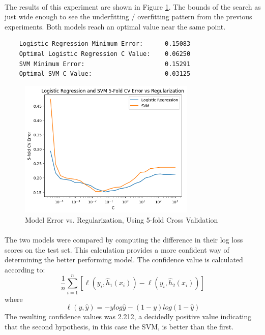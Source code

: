 \documentclass[12pt, letterpaper]{article}
\begin{document}
\paragraph*{}The results of this experiment are shown in Figure \ref{fig:6}. The
bounds of the search as just wide enough to see the underfitting / overfitting
pattern from the previous experiments. Both models reach an optimal value near
the same point.

\begin{verbatim}
    Logistic Regression Minimum Error:      0.15083
    Optimal Logistic Regression C Value:    0.06250
    SVM Minimum Error:                      0.15291
    Optimal SVM C Value:                    0.03125
\end{verbatim}

\begin{figure}[ht]
    \centering
    \includegraphics[width=0.75\textwidth]{4.png}
    \caption{Model Error vs. Regularization, Using 5-fold Cross Validation}
    \label{fig:6}
\end{figure}

\paragraph*{}The two models were compared by computing the difference in their
log loss scores on the test set. This calculation provides a more confident way
of determining the better performing model. The confidence value is calculated 
according to:
\begin{equation}
    \frac{1}{n} \sum_{i=1}^{n} [\ell (y_i, \hat{h}_1(x_i)) - \ell (y_i, \hat{h}_2(x_i))]
\end{equation}
where
\begin{equation}
    \ell(y, \hat{y}) = -ylog \hat{y} - (1-y) log (1-\hat{y})
\end{equation}
The resulting confidence values was 2.212, a decidedly positive value indicating
that the second hypothesis, in this case the SVM, is better than the first.
\end{document}
